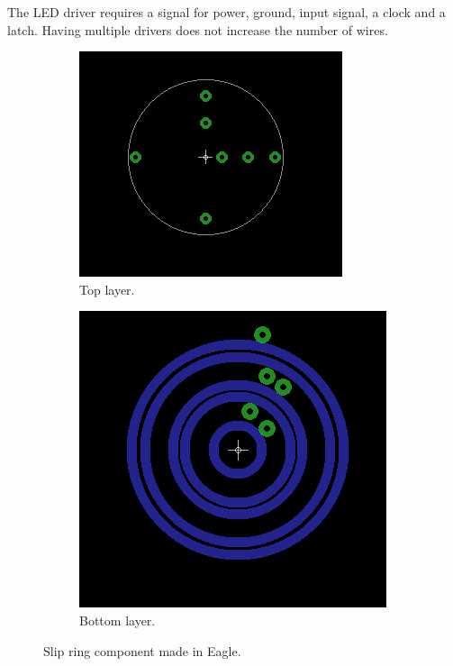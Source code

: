 The LED driver requires a signal for power, ground, input signal, a clock and a latch.
Having multiple drivers does not increase the number of wires.

\begin{figure}[h]
 \centering
 \begin{subfigure}{0.4\linewidth}
 \centering
  \includegraphics[width=0.8\linewidth]{img/slip_ring_top}
 \caption{Top layer.}
 \label{fig:slip_ring_top}
 \end{subfigure}
 \begin{subfigure}{0.4\linewidth}
 \centering
  \includegraphics[width=0.8\linewidth]{img/slip_ring_bot}
 \caption{Bottom layer.}
 \label{fig:slip_ring_bot}
 \end{subfigure}
 \caption{Slip ring component made in Eagle.}
 \label{fig:slip_ring_eagle}
\end{figure}

